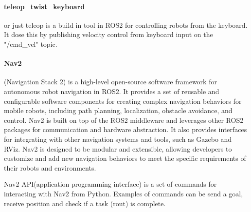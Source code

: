 \paragraph{teleop_twist_keyboard} or just teleop is a build in tool in ROS2 for controlling robots from the keyboard. It dose this by publishing velocity control from keyboard input on the "/cmd\_vel" topic.   

\paragraph{Nav2} (Navigation Stack 2) \cite{rosnavigation} is a high-level open-source software framework for autonomous robot navigation in ROS2. It provides a set of reusable and configurable software components for creating complex navigation behaviors for mobile robots, including path planning, localization, obstacle avoidance, and control. Nav2 is built on top of the ROS2 middleware and leverages other ROS2 packages for communication and hardware abstraction. It also provides interfaces for integrating with other navigation systems and tools, such as Gazebo and RViz. Nav2 is designed to be modular and extensible, allowing developers to customize and add new navigation behaviors to meet the specific requirements of their robots and environments.

Nav2 API(application programming interface)\cite{rosnavAPI} is a set of commands for interacting with Nav2 from Python. Examples of commands can be send a goal, receive position and check if a task (rout) is complete.    

